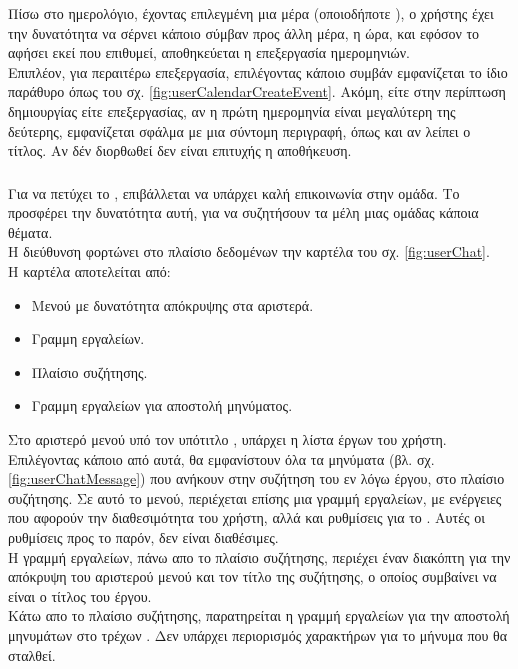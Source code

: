 \pSpace Πίσω στο ημερολόγιο, έχοντας επιλεγμένη μια μέρα (οποιοδήποτε ), ο χρήστης έχει την δυνατότητα να σέρνει κάποιο σύμβαν προς άλλη μέρα, η ώρα, και εφόσον το αφήσει εκεί που επιθυμεί, αποθηκεύεται η επεξεργασία ημερομηνιών.\\
\pSpace Επιπλέον, για περαιτέρω επεξεργασία, επιλέγοντας κάποιο συμβάν εμφανίζεται το ίδιο παράθυρο όπως του σχ. \ref{fig:userCalendarCreateEvent}. Ακόμη, είτε στην περίπτωση δημιουργίας είτε επεξεργασίας, αν η πρώτη ημερομηνία είναι μεγαλύτερη της δεύτερης, εμφανίζεται σφάλμα με μια σύντομη περιγραφή, όπως και αν λείπει ο τίτλος. Αν δέν διορθωθεί δεν είναι επιτυχής η αποθήκευση.

\subsubsection*{}
\pSpace Για να πετύχει το , επιβάλλεται να υπάρχει καλή επικοινωνία στην ομάδα. Το  προσφέρει την δυνατότητα αυτή, για να συζητήσουν τα μέλη μιας ομάδας κάποια θέματα.\\
\pSpace Η διεύθυνση  φορτώνει στο πλαίσιο δεδομένων την καρτέλα του σχ. \ref{fig:userChat}.\\
\pSpace Η καρτέλα αποτελείται από:\\
\begin{itemize}
	\item Μενού με δυνατότητα απόκρυψης στα αριστερά.
	\item Γραμμη εργαλείων.
	\item Πλαίσιο συζήτησης.
	\item Γραμμη εργαλείων για αποστολή μηνύματος.
\end{itemize}

\pSpace Στο αριστερό μενού υπό τον υπότιτλο , υπάρχει η λίστα έργων του χρήστη. Επιλέγοντας κάποιο από αυτά, θα εμφανίστουν όλα τα μηνύματα (βλ. σχ. \ref{fig:userChatMessage}) που ανήκουν στην συζήτηση του εν λόγω έργου, στο πλαίσιο συζήτησης. Σε αυτό το μενού, περιέχεται επίσης μια γραμμή εργαλείων, με ενέργειες που αφορούν την διαθεσιμότητα του χρήστη, αλλά και ρυθμίσεις για το . Αυτές οι ρυθμίσεις προς το παρόν, δεν είναι διαθέσιμες.\\
\pagebreak
\pSpace Η γραμμή εργαλείων, πάνω απο το πλαίσιο συζήτησης, περιέχει έναν διακόπτη για την απόκρυψη του αριστερού μενού και τον τίτλο της συζήτησης, ο οποίος συμβαίνει να είναι ο τίτλος του έργου.\\
\pSpace Κάτω απο το πλαίσιο συζήτησης, παρατηρείται η γραμμή εργαλείων για την αποστολή μηνυμάτων στο τρέχων . Δεν υπάρχει περιορισμός χαρακτήρων για το μήνυμα που θα σταλθεί.\\

